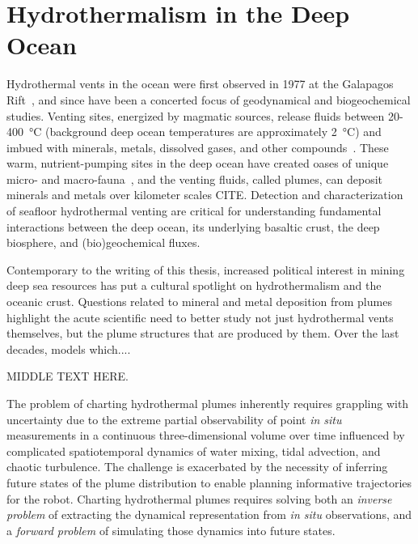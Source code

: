 

\section{Hydrothermalism in the Deep Ocean}
\label{sec:charting-plumes}
Hydrothermal vents in the ocean were first observed in 1977 at the Galapagos Rift~\autocite{corliss1979submarine}, and since have been a concerted focus of geodynamical and biogeochemical studies.
Venting sites, energized by magmatic sources, release fluids between 20-\SI{400}{\celsius} (background deep ocean temperatures are approximately \SI{2}{\celsius}) and imbued with minerals, metals, dissolved gases, and other compounds~\autocite{jannasch1985geomicrobiology, martin2008hydrothermal}.
These warm, nutrient-pumping sites in the deep ocean have created oases of unique micro- and macro-fauna~\autocite{corliss1979submarine}, and the venting fluids, called plumes, can deposit minerals and metals over kilometer scales CITE.
Detection and characterization of seafloor hydrothermal venting are critical for  understanding fundamental interactions between the deep ocean, its underlying basaltic crust, the deep biosphere, and (bio)geochemical fluxes.

Contemporary to the writing of this thesis, increased political interest in mining deep sea resources has put a cultural spotlight on hydrothermalism and the oceanic crust.
Questions related to mineral and metal deposition from plumes highlight the acute scientific need to better study not just hydrothermal vents themselves, but the plume structures that are produced by them.
Over the last decades, models which....

MIDDLE TEXT HERE.

The problem of charting hydrothermal plumes inherently requires grappling with uncertainty due to the extreme partial observability of point \emph{in situ} measurements in a continuous three-dimensional volume over time influenced by complicated spatiotemporal dynamics of water mixing, tidal advection, and chaotic turbulence. The challenge is exacerbated by the necessity of inferring future states of the plume distribution to enable planning informative trajectories for the robot. Charting hydrothermal plumes requires solving both an \emph{inverse problem} of extracting the dynamical representation from \emph{in situ} observations, and a \emph{forward problem} of simulating those dynamics into future states.

